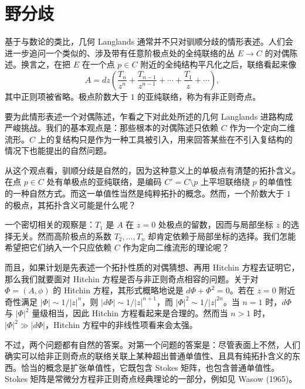 \section{野分歧}

基于与数论的类比，几何 Langlands 通常并不只对驯顺分歧的情形表述。人们会进一步追问一个类似的、涉及带有任意阶极点处的全纯联络的丛 $E\to C$ 的对偶陈述。换言之，在把 $E$ 在一个点 $p\in C$ 附近的全纯结构平凡化之后，联络看起来像
\begin{equation}
A=dz\left(\frac{T_{n}}{z^{n}}+\frac{T_{n-1}}{z^{n-1}}+\cdots+\frac{T_{1}}{z}+\cdots\right),
\label{eq:wild}
\end{equation}
其中正则项被省略。极点阶数大于 $1$ 的亚纯联络，称为有非正则奇点。

要为此情形表述一个对偶陈述，乍看之下对此处所述的几何 Langlands 进路构成严峻挑战。我们的基本观点是：那些根本的对偶陈述只依赖 $C$ 作为一个定向二维流形。$C$ 上的复结构只是作为一种工具被引入，用来回答某些在不引入复结构的情况下也能提出的自然问题。

从这个观点看，驯顺分歧是自然的，因为这种意义上的单极点有清楚的拓扑含义。在点 $p\in C$ 处有单极点的亚纯联络，是编码 $C'=C\setminus p$ 上平坦联络绕 $p$ 的单值性的一种自然方式。而这一单值性当然是纯粹拓扑的概念。然而，一个阶数大于 $1$ 的极点，其拓扑含义可能是什么呢？

一个密切相关的观察是：$T_{1}$ 是 $A$ 在 $z=0$ 处极点的留数，因而与局部坐标 $z$ 的选择无关。然而高阶极点的系数 $T_{2},\dots,T_{n}$ 却肯定依赖于局部坐标的选择。我们怎能希望把它们纳入一个只应依赖 $C$ 作为定向二维流形的理论呢？

而且，如果计划是先表述一个拓扑性质的对偶猜想、再用 Hitchin 方程去证明它，那么我们就要面对 Hitchin 方程是否与非正则奇点相容的问题。关于对 $\Phi=(A,\phi)$ 的 Hitchin 方程，其形式概略地说是 $d\Phi+\Phi^{2}=0$。若在 $z=0$ 附近奇性满足 $|\Phi|\sim1/|z|^{n}$，则 $|d\Phi|\sim1/|z|^{n+1}$，而 $|\Phi|^{2}\sim1/|z|^{2n}$。当 $n=1$ 时，$d\Phi$ 与 $|\Phi|^{2}$ 量级相当，因此 Hitchin 方程看起来是合理的。然而当 $n>1$ 时，$|\Phi|^{2}\gg|d\Phi|$，Hitchin 方程中的非线性项看来会太强。

不过，两个问题都有自然的答案。对第一个问题的答案是：尽管表面上不然，人们确实可以给非正则奇点的联络关联上某种超出普通单值性、且具有纯拓扑含义的东西。恰当的概念是扩张单值性，它既包含 Stokes 矩阵，也包含普通单值性。Stokes 矩阵是常微分方程非正则奇点经典理论的一部分，例如见 Wasow (1965)。

